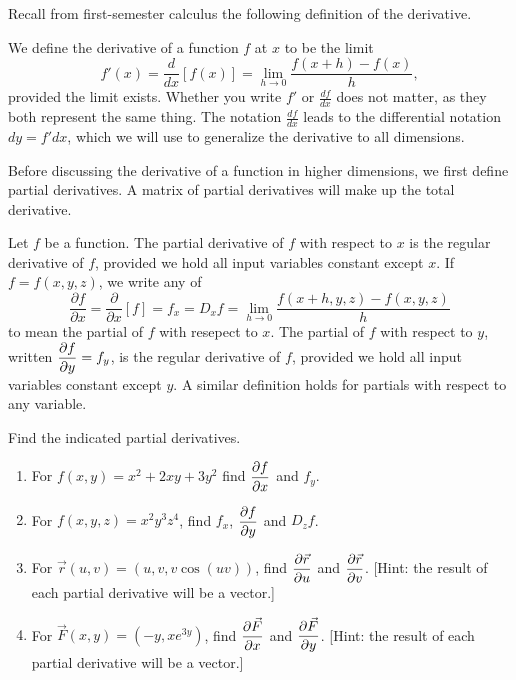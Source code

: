 Recall from first-semester calculus the following definition of the derivative.
\begin{dfn}
We define the derivative of a function $f$ at $x$ to be the limit
$$f'(x)=\frac{d}{dx}[f(x)]=\lim_{h\to 0}\frac{f(x+h)-f(x)}{h},$$
provided the limit exists. Whether you write $f'$ or $\frac{df}{dx}$ does not matter, as they both represent the same thing.  The notation $\frac{df}{dx}$ leads to the differential notation $dy=f'dx$, which we will use to generalize the derivative to all dimensions.
\end{dfn}
Before discussing the derivative of a function in higher dimensions, we first define partial derivatives. A matrix of partial derivatives will make up the total derivative.
\begin{dfn}
 Let $f$ be a function.  The partial derivative of $f$ with respect to $x$ is the regular derivative of $f$, provided we hold all input variables constant except $x$.  If $f=f(x,y,z)$, we write any of 
 $$\frac{\partial f}{\partial x}=\frac{\partial}{\partial x}[f]=f_x = D_x f=\lim_{h\to 0}\frac{f(x+h,y,z)-f(x,y,z)}{h}$$
to mean the partial of $f$ with resepect to $x$.
 The partial of $f$ with respect to $y$, written $\displaystyle \frac{\partial f}{\partial y}=f_y$, is the regular derivative of $f$, provided we hold all input variables constant except $y$. A similar definition holds for partials with respect to any variable.
\end{dfn}

\begin{problem}%
 Find the indicated partial derivatives.
\begin{enumerate}
 \item For $f(x,y)=x^2+2xy+3y^2$ find $\displaystyle\frac{\partial f}{\partial x}$ and $f_y$.
 \item For $f(x,y,z)=x^2y^3z^4$, find $f_x$, $\displaystyle\frac{\partial f}{\partial y}$ and $D_z f$.
 \item For $\vec r(u,v) = (u,v,v\cos(uv))$, find $\displaystyle\frac{\partial \vec r}{\partial u}$ and $\displaystyle\frac{\partial \vec r}{\partial v}$. [Hint: the result of each partial derivative will be a vector.]
 \item For $\vec F(x,y) = (-y,xe^{3y})$, find $\displaystyle\frac{\partial \vec F}{\partial x}$ and $\displaystyle\frac{\partial \vec F}{\partial y}$.  [Hint: the result of each partial derivative will be a vector.]
\end{enumerate}
\end{problem}

